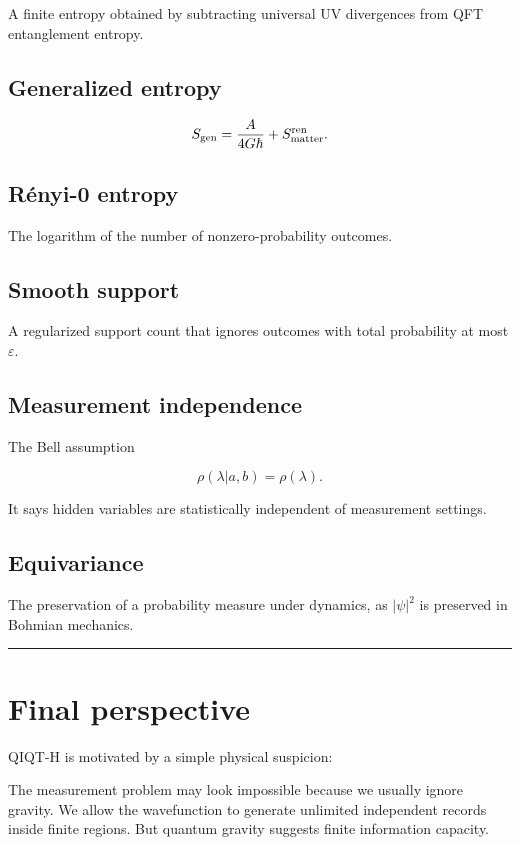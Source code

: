 \documentclass[11pt,a4paper]{article}
\newenvironment{qiqtquote}{\begin{mdframed}[style=quotestyle]}{\end{mdframed}}
\begin{document}
A finite entropy obtained by subtracting universal UV divergences from QFT entanglement entropy.

\subsection{Generalized entropy}

\[
S_{\rm gen}
=
\frac{A}{4G\hbar}
+
S_{\rm matter}^{\rm ren}.
\]

\subsection{Rényi-0 entropy}

The logarithm of the number of nonzero-probability outcomes.

\subsection{Smooth support}

A regularized support count that ignores outcomes with total probability at most $\varepsilon$.

\subsection{Measurement independence}

The Bell assumption

\[
\rho(\lambda|a,b)=\rho(\lambda).
\]

It says hidden variables are statistically independent of measurement settings.

\subsection{Equivariance}

The preservation of a probability measure under dynamics, as $|\psi|^2$ is preserved in Bohmian mechanics.

\medskip\hrule\medskip

\section{Final perspective}

QIQT-H is motivated by a simple physical suspicion:

\begin{qiqtquote}
The measurement problem may look impossible because we usually ignore gravity. We allow the wavefunction to generate unlimited independent records inside finite regions. But quantum gravity suggests finite information capacity.
\end{qiqtquote}
\end{document}
